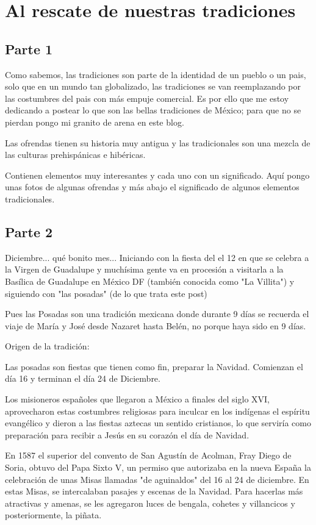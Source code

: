 \chapter{Al rescate de nuestras tradiciones}
\section{Parte 1}
Como sabemos, las tradiciones son parte de la identidad de un pueblo o un pais, solo que en un mundo tan globalizado, las tradiciones se van reemplazando por las costumbres del pais con más empuje comercial. Es por ello que me estoy dedicando a postear lo que son las bellas tradiciones de México; para que no se pierdan pongo mi granito de arena en este blog.

Las ofrendas tienen su historia muy antigua y las tradicionales son una mezcla de las culturas prehispánicas e hibéricas.

Contienen elementos muy interesantes y cada uno con un significado. Aquí pongo unas fotos de algunas ofrendas y más abajo el significado de algunos elementos tradicionales.

\section{Parte 2}
Diciembre... qué bonito mes... Iniciando con la fiesta del el 12 en que se celebra a la Virgen de Guadalupe y muchísima gente va en procesión a visitarla a la Basílica de Guadalupe en México DF (también conocida como "La Villita") y siguiendo con "las posadas" (de lo que trata este post)

Pues las Posadas son una tradición mexicana donde durante 9 días se recuerda el viaje de María y José desde Nazaret hasta Belén, no porque haya sido en 9 días.

Origen de la tradición:

Las posadas son fiestas que tienen como fin, preparar la Navidad. Comienzan el día 16 y terminan el día 24 de Diciembre.

Los misioneros españoles que llegaron a México a finales del siglo XVI, aprovecharon estas costumbres religiosas para inculcar en los indígenas el espíritu evangélico y dieron a las fiestas aztecas un sentido cristianos, lo que serviría como preparación para recibir a Jesús en su corazón el día de Navidad.

En 1587 el superior del convento de San Agustín de Acolman, Fray Diego de Soria, obtuvo del Papa Sixto V, un permiso que autorizaba en la nueva España la celebración de unas Misas llamadas "de aguinaldos" del 16 al 24 de diciembre. En estas Misas, se intercalaban pasajes y escenas de la Navidad. Para hacerlas más atractivas y amenas, se les agregaron luces de bengala, cohetes y villancicos y posteriormente, la piñata.


